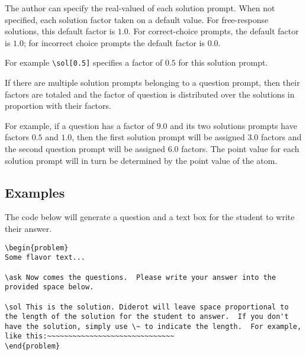 \begin{cluster}
\label{grp:grm:quiz::solution-factors}

\begin{gram}
\label{grm:quiz::solution-factors}
The author can specify the real-valued  of each solution prompt.  
When not specified, each solution factor taken on a default value.
For free-response solutions, this default factor is $1.0$.
For correct-choice prompts, the default factor is $1.0$; for incorrect
choice prompts the default factor is $0.0$.

For example \lstinline`\sol[0.5]` specifies a factor of $0.5$ for this
solution prompt. 

If there are multiple solution prompts belonging to a question prompt,
then their factors are totaled and the factor of question is distributed
over the solutions in proportion with their factors.  

For example, if a question has a factor of $9.0$ and its two solutions
prompts have factors $0.5$ and $1.0$, then the first solution prompt
will be assigned $3.0$ factors and the second question prompt will be
assigned $6.0$ factors.  The point value for each solution prompt will
in turn be determined by the point value of the atom.

\end{gram}
\end{cluster}


\subsection{Examples}
\label{sec:quiz::examples}

\begin{cluster}
\label{grp:xmpl:quiz::free-response-with-a-single-solution}

\begin{example}
\label{xmpl:quiz::free-response-with-a-single-solution}
The code below will generate a question and a text box for the student
to write their answer.

\begin{lstlisting}
\begin{problem}
Some flavor text...

\ask Now comes the questions.  Please write your answer into the
provided space below.

\sol This is the solution. Diderot will leave space proportional to
the length of the solution for the student to answer.  If you don't
have the solution, simply use \~ to indicate the length.  For example,
like this:~~~~~~~~~~~~~~~~~~~~~~~~~~~~~~
\end{problem}
\end{lstlisting}

\end{example}
\end{cluster}

